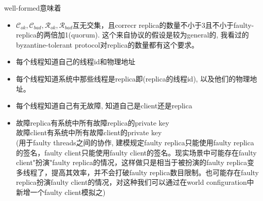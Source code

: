 \documentclass[UTF8, 8pt, a4paper ]{ctexart}
\newcommand{\clientSet}{\mathcal{C}_{\textit{ok}}}
\newcommand{\replicaSet}{\mathcal{R}_{\textit{ok}}}
\newcommand{\faultyClients}{\mathcal{C}_{\textit{bad}}}
\newcommand{\faultyReplica}{\mathcal{R}_{\textit{bad}}}
\begin{document}
\begin{small}

	\textsf{well-formed}意味着
	\begin{itemize}
		\item $ \clientSet, \faultyClients, \replicaSet, \faultyReplica $互无交集，且correcr replica的数量不小于$ 3 $且不小于faulty-replica的两倍加1(quorum). 这个来自协议的假设是较为general的, 我看过的byzantine-tolerant protocol对replica的数量都有这个要求。
		
		
		\item 每个线程知道自己的线程id和物理地址
		
		\item 每个线程知道系统中那些线程是replica即(replica的线程id), 以及他们的物理地址。
		
		\item 每个线程知道自己有无故障, 知道自己是client还是replica
		
		\item 故障replica有系统中所有故障replica的private key\\
			故障client有系统中所有故障client的private key \\
			(用于faulty threads之间的协作, 建模规定faulty replica只能使用faulty replica的签名，faulty client只能使用faulty client的签名。现实场景中可能存在faulty client"扮演"faulty replica的情况，这样做只是相当于被扮演的faulty replica变多线程了，提高其效率，并不会打破faulty replica数目限制。也可能存在faulty replica扮演faulty client的情况，对这种我们可以通过在world configuration中新增一个faulty client模拟之)
		

\end{itemize}
\end{small}
\end{document}
